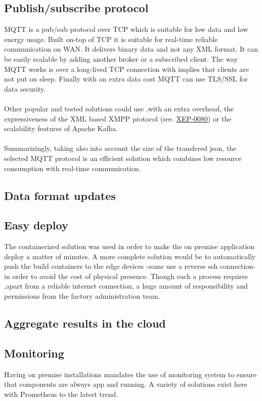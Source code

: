 \documentclass[a4paper,10pt]{article}
\begin{document}
\subsection{Publish/subscribe protocol}
MQTT is a pub/sub protocol over TCP which is suitable for low data and low energy usage.
Built on-top of TCP it is suitable for real-time reliable communication on WAN. It delivers
binary data and not any XML format. It can be easily scalable by adding another broker or a subscribed
client. The way MQTT works is over a long-lived TCP connection with implies that clients are not put on sleep.
Finally with an extra data cost MQTT can use TLS/SSL for data security.\\
\\
Other popular and tested solutions could use ,with an extra overhead, the expressiveness of the XML based
XMPP protocol (see. \href{https://xmpp.org/extensions/xep-0080.html}{XEP-0080}) or the scalability features
of Apache Kafka.\\
\\
Summarizingly, taking also into account the size of the transfered json, the selected MQTT protocol is an
efficient solution which combines low resource consumption with real-time communication.

\subsection{Data format updates}
\subsection{Easy deploy}
The containerized solution was used in order to make the on premise application deploy a matter of minutes. A more
complete solution would be to automatically push the build containers  to the edge devices -some use a reverse ssh connection-
in order to avoid the cost of physical presence. Though such a process requires ,apart from a reliable internet connection,
a huge amount of responsibility and permissions from the factory administration team.
\subsection{Aggregate results in the cloud}
\subsection{Monitoring}
Having on premise installations mandates the use of monitoring system to ensure that components are always app and running.
A variety of solutions exist here with Prometheus to the latest trend.
\end{document}
